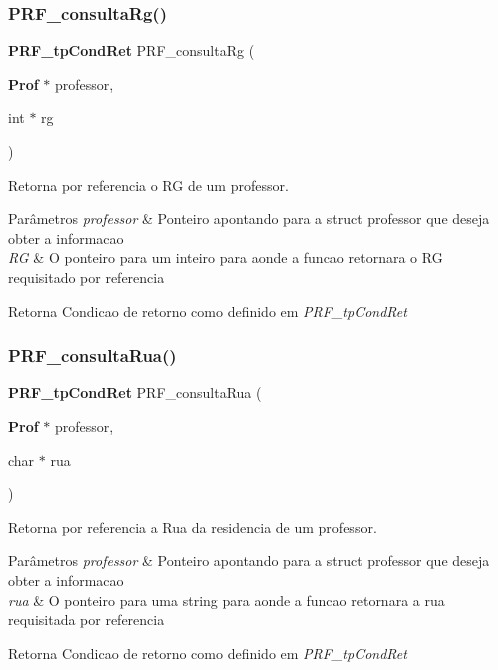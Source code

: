 \subsubsection{P\+R\+F\+\_\+consulta\+Rg()}
{\footnotesize\ttfamily \textbf{ P\+R\+F\+\_\+tp\+Cond\+Ret} P\+R\+F\+\_\+consulta\+Rg (\begin{DoxyParamCaption}\item[{\textbf{ Prof} $\ast$}]{professor,  }\item[{int $\ast$}]{rg }\end{DoxyParamCaption})}



Retorna por referencia o RG de um professor. 


\begin{DoxyParams}{Parâmetros}
{\em professor} & Ponteiro apontando para a struct professor que deseja obter a informacao \\
\hline
{\em RG} & O ponteiro para um inteiro para aonde a funcao retornara o RG requisitado por referencia \\
\hline
\end{DoxyParams}
\begin{DoxyReturn}{Retorna}
Condicao de retorno como definido em {\itshape P\+R\+F\+\_\+tp\+Cond\+Ret} 
\end{DoxyReturn}
\mbox{\label{group__modulo_professor_ga81a5d9fbbd4075120126fb58850c46c5}} 
\subsubsection{P\+R\+F\+\_\+consulta\+Rua()}
{\footnotesize\ttfamily \textbf{ P\+R\+F\+\_\+tp\+Cond\+Ret} P\+R\+F\+\_\+consulta\+Rua (\begin{DoxyParamCaption}\item[{\textbf{ Prof} $\ast$}]{professor,  }\item[{char $\ast$}]{rua }\end{DoxyParamCaption})}



Retorna por referencia a Rua da residencia de um professor. 


\begin{DoxyParams}{Parâmetros}
{\em professor} & Ponteiro apontando para a struct professor que deseja obter a informacao \\
\hline
{\em rua} & O ponteiro para uma string para aonde a funcao retornara a rua requisitada por referencia \\
\hline
\end{DoxyParams}
\begin{DoxyReturn}{Retorna}
Condicao de retorno como definido em {\itshape P\+R\+F\+\_\+tp\+Cond\+Ret} 
\end{DoxyReturn}
\mbox{\label{group__modulo_professor_gaeb7c31b9566b846bf56494458a0c6bd9}} 
